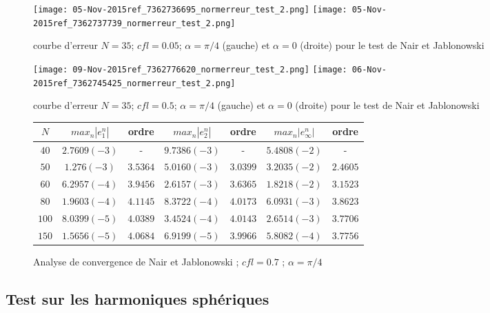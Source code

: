 \begin{figure}[H]
\texttt{[image: 05-Nov-2015ref\_7362736695\_normerreur\_test\_2.png]}
\texttt{[image: 05-Nov-2015ref\_7362737739\_normerreur\_test\_2.png]}
\label{erreur_cfl=0.05}
\caption{courbe d'erreur $N=35$; $cfl=0.05$; $\alpha = \pi / 4$ (gauche) et $\alpha = 0$ (droite) pour le test de Nair et Jablonowski \cite{Nair2008}}
\end{figure}



\begin{figure}[H]
\texttt{[image: 09-Nov-2015ref\_7362776620\_normerreur\_test\_2.png]}
\texttt{[image: 06-Nov-2015ref\_7362745425\_normerreur\_test\_2.png]}
\label{erreur_cfl=0.5}
\caption{courbe d'erreur $N=35$; $cfl=0.5$; $\alpha = \pi / 4$ (gauche) et $\alpha = 0$ (droite) pour le test de Nair et Jablonowski \cite{Nair2008}}
\end{figure}



\begin{figure}
\begin{tabular}{c||cc|cc|cc}
$N$ & $max_n |e_1^n|$ & ordre  & $max_n |e_2^n|$ & ordre  & $max_n |e_{\infty}^n|$ & ordre \\
\hline
\hline
$40$ & $2.7609 (-3)$ & -  & $9.7386 (-3)$ & - & $5.4808 (-2)$  & - \\
\hline 
$50$ & $1.276 (-3)$ & $3.5364$ & $5.0160 (-3)$ & $3.0399$ & $3.2035 (-2)$ & $2.4605$ \\
\hline
$60$ & $6.2957 (-4)$ & $3.9456$ & $2.6157 (-3)$ & $3.6365$ & $1.8218 (-2)$ & $3.1523$ \\
\hline
$80$ & $1.9603 (-4) $ & $4.1145$ & $8.3722 (-4)$ & $4.0173$ & $6.0931 (-3)$ & $3.8623$ \\
\hline
$100$ & $8.0399 (-5)$ & $4.0389$ & $3.4524 (-4)$ & $4.0143$ & $2.6514 (-3)$ & $3.7706$\\
\hline
$150$ & $1.5656 (-5)$ & $4.0684$ & $6.9199 (-5)$ & $3.9966$ & $5.8082 (-4)$ & $3.7756$
\end{tabular}
\caption{Analyse de convergence de Nair et Jablonowski \cite{Nair2008} ; $cfl = 0.7$ ; $\alpha = \pi /4$}
\end{figure}


\subsection{Test sur les harmoniques sphériques}
